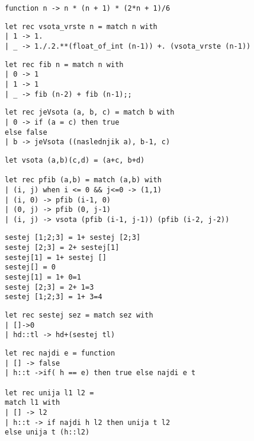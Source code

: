 \begin{Odgovor}{2.1}
\begin{lstlisting}
function n -> n * (n + 1) * (2*n + 1)/6
\end{lstlisting}
\end{Odgovor}
\begin{Odgovor}{2.2}
\begin{lstlisting}
let rec vsota_vrste n = match n with
| 1 -> 1.
| _ -> 1./.2.**(float_of_int (n-1)) +. (vsota_vrste (n-1))
\end{lstlisting}
\end{Odgovor}
\begin{Odgovor}{2.3}
\begin{lstlisting}
let rec fib n = match n with
| 0 -> 1
| 1 -> 1
| _ -> fib (n-2) + fib (n-1);;
\end{lstlisting}
\end{Odgovor}
\begin{Odgovor}{2.4}
\begin{lstlisting}
let rec jeVsota (a, b, c) = match b with
| 0 -> if (a = c) then true
else false
| b -> jeVsota ((naslednjik a), b-1, c)
\end{lstlisting}
\end{Odgovor}
\begin{Odgovor}{2.5}
\begin{lstlisting}
let vsota (a,b)(c,d) = (a+c, b+d)

let rec pfib (a,b) = match (a,b) with
| (i, j) when i <= 0 && j<=0 -> (1,1)
| (i, 0) -> pfib (i-1, 0)
| (0, j) -> pfib (0, j-1)
| (i, j) -> vsota (pfib (i-1, j-1)) (pfib (i-2, j-2))
\end{lstlisting}
\end{Odgovor}
\begin{Odgovor}{2.7}
\begin{lstlisting}
sestej [1;2;3] = 1+ sestej [2;3]
sestej [2;3] = 2+ sestej[1]
sestej[1] = 1+ sestej []
sestej[] = 0
sestej[1] = 1+ 0=1
sestej [2;3] = 2+ 1=3
sestej [1;2;3] = 1+ 3=4
\end{lstlisting}
\end{Odgovor}
\begin{Odgovor}{2.8}
\begin{lstlisting}
let rec sestej sez = match sez with
| []->0
| hd::tl -> hd+(sestej tl)
\end{lstlisting}
\end{Odgovor}
\begin{Odgovor}{2.9}
\begin{lstlisting}
let rec najdi e = function
| [] -> false
| h::t ->if( h == e) then true else najdi e t

let rec unija l1 l2 =
match l1 with
| [] -> l2
| h::t -> if najdi h l2 then unija t l2
else unija t (h::l2)
\end{lstlisting}
\end{Odgovor}
